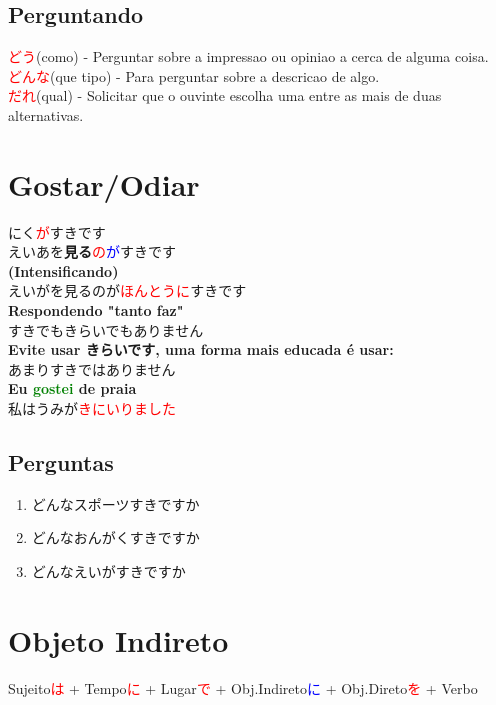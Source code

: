 \documentclass[a4paper, 12pt]{article}
\begin{document}
\subsection{Perguntando}
\begin{CJK}{UTF8}{min}	
	\textcolor{red}{どう}(como) - Perguntar sobre a impressao ou opiniao a cerca de alguma coisa.\\
	\textcolor{red}{どんな}(que tipo) - Para perguntar sobre a descricao de algo.\\
	\textcolor{red}{だれ}(qual) - Solicitar que o ouvinte escolha uma entre as mais de duas alternativas.
\end{CJK}

\section{Gostar/Odiar}
\begin{CJK}{UTF8}{min}
	にく\textcolor{red}{が}すきです\\
	えいあを\textbf{見る}\textcolor{red}{の}\textcolor{blue}{が}すきです\\
	
	\textbf{(Intensificando)}\\
	えいがを見るのが\textcolor{red}{ほんとうに}すきです\\
	
	\textbf{Respondendo "tanto faz"}\\
	すきでもきらいでもありません\\
	
	\textbf{Evite usar きらいです, uma forma mais educada é usar:}\\
	あまりすきではありません\\
	
	\textbf{Eu \textcolor{green}{gostei} de praia}\\
	私はうみが\textcolor{red}{きにいりました}
	
	\subsection{Perguntas}
		\begin{enumerate}
			\item どんなスポーツすきですか
			\item どんなおんがくすきですか
			\item どんなえいがすきですか
		\end{enumerate}
\end{CJK}

\section{Objeto Indireto}
\begin{CJK}{UTF8}{min}
	Sujeito\textcolor{red}{は} + Tempo\textcolor{red}{に} + Lugar\textcolor{red}{で} + Obj.Indireto\textcolor{blue}{に} + Obj.Direto\textcolor{red}{を} + Verbo
\end{CJK}
\end{document}
